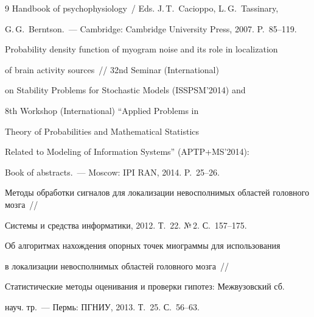 {{\begin{thebibliography}{9}
Handbook of psychophysiology~/ Eds. J.\,T.~Cacioppo, L.\,G.~Tassinary,


G.\,G.~Berntson.~--- Cambridge: Cambridge University Press, 2007. P.~85--119.









Probability density function of myogram noise and its role in localization


of brain activity sources~/\!\!/ 32nd  Seminar (International)


on Stability Problems for Stochastic Models (ISSPSM'2014) and


8th  Workshop (International) ``Applied Problems in


Theory of Probabilities and Mathematical Statistics


Related to Modeling of Information Systems'' (APTP\;+\;MS'2014):


Book of abstracts.~--- Moscow: IPI RAN, 2014. P.~25--26.









Методы обработки сигналов для локализации невосполнимых областей головного мозга~/\!\!/


Системы и средства информатики, 2012. Т.~22. №\,2. С.~157--175.






Об алгоритмах нахождения опорных точек миограммы для использования


в локализации невосполнимых областей головного мозга~/\!\!/


Статистические методы оценивания и проверки гипотез: Межвузовский сб.


науч. тр.~--- Пермь: ПГНИУ, 2013.  Т.~25. С.~56--63.





\end{thebibliography}


} }





